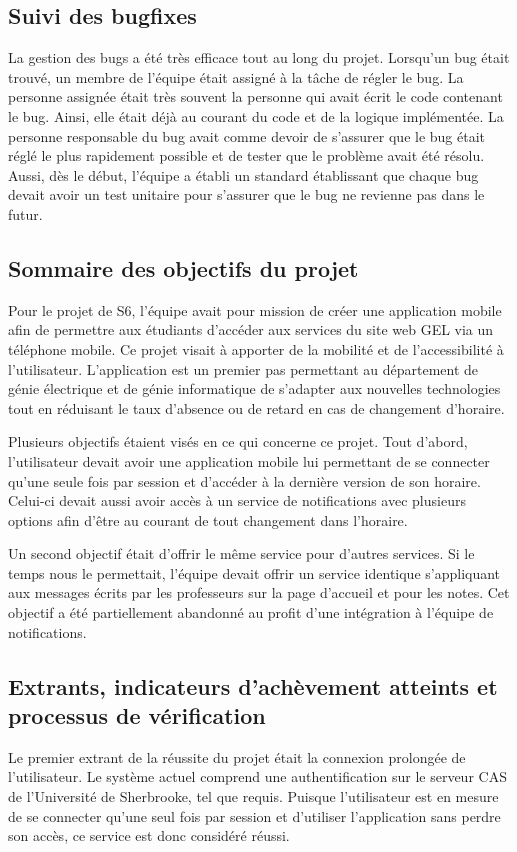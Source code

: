    \subsection{Suivi des bugfixes}
    La gestion des bugs a été très efficace tout au long du projet. Lorsqu'un bug était trouvé, un membre de l'équipe était assigné à la tâche de régler le bug. La personne assignée était très souvent la personne qui avait écrit le code contenant le bug. Ainsi, elle était déjà au courant du code et de la logique implémentée. La personne responsable du bug avait comme devoir de s'assurer que le bug était réglé le plus rapidement possible et de tester que le problème avait été résolu. Aussi, dès le début, l'équipe a établi un standard établissant que chaque bug devait avoir un test unitaire pour s'assurer que le bug ne revienne pas dans le futur.

    \subsection{Sommaire des objectifs du projet}
    Pour le projet de S6, l'équipe avait pour mission de créer une application mobile afin de permettre aux étudiants d'accéder aux services du site web GEL via un téléphone mobile. Ce projet visait à apporter de la mobilité et de l'accessibilité à l'utilisateur. L'application est un premier pas permettant au département de génie électrique et de génie informatique de s'adapter aux nouvelles technologies tout en réduisant le taux d'absence ou de retard en cas de changement d'horaire.

    Plusieurs objectifs étaient visés en ce qui concerne ce projet. Tout d'abord, l'utilisateur devait avoir une application mobile lui permettant de se connecter qu'une seule fois par session et d'accéder à la dernière version de son horaire. Celui-ci devait aussi avoir accès à un service de notifications avec plusieurs options afin d'être au courant de tout changement dans l'horaire.

    Un second objectif était d'offrir le même service pour d'autres services. Si le temps nous le permettait, l'équipe devait offrir un service identique s'appliquant aux messages écrits par les professeurs sur la page d'accueil et pour les notes. Cet objectif a été partiellement abandonné au profit d'une intégration à l'équipe de notifications.

    \pagebreak
    \subsection{Extrants, indicateurs d'achèvement atteints et processus de vérification}
    Le premier extrant de la réussite du projet était la connexion prolongée de l'utilisateur. Le système actuel comprend une authentification sur le serveur CAS de l'Université de Sherbrooke, tel que requis. Puisque l'utilisateur est en mesure de se connecter qu'une seul fois par session et d'utiliser l'application sans perdre son accès, ce service est donc considéré réussi.

